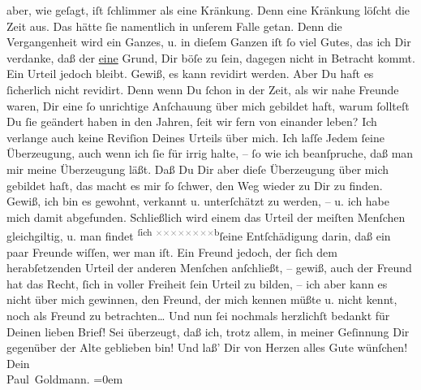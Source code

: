 \begin{ledgroupsized}[t]{13cm}
               aber, wie geſagt, {\pb}iſt ſchlimmer als eine
               Kränkung. Denn eine Kränkung löſcht die Zeit aus. Das hätte ſie namentlich in unſerem
               Falle getan. \strikeout{\textcolor{gray}{S}} Denn die Vergangenheit wird ein Ganzes, u. in dieſem Ganzen iſt ſo viel Gutes,
               das ich Dir verdanke, daß der \uline{eine} Grund, Dir böſe zu
               ſein, dagegen nicht in Betracht kommt.\pend
           \pstart
           Ein Urteil jedoch bleibt. Gewiß, es kann revidirt werden. Aber Du haft es ſicherlich
               nicht revidirt. Denn wenn Du ſchon in der Zeit, als wir nahe Freunde waren, Dir eine
               ſo unrichtige Anſchauung über mich {\pb}gebildet
               haft, warum ſollteſt Du ſie geändert haben in den Jahren, ſeit wir fern von einander
               leben? Ich verlange auch keine Reviſion Deines Urteils über mich. Ich laſſe Jedem
               ſeine Überzeugung, auch wenn ich ſie für irrig halte, – ſo wie ich beanſpruche, daß
               man mir meine Überzeugung läßt. Daß Du Dir aber dieſe Überzeugung über mich gebildet
               haſt, das macht es mir ſo ſchwer, den Weg wieder zu Dir zu finden. Gewiß, ich bin es
               gewohnt, verkannt u. unterſchätzt {\pb}zu werden, –
               u. ich habe mich damit abgefunden. Schließlich wird einem das Urteil der meiſten
               Menſchen gleichgiltig, u. man findet \substVorne{}\textsuperscript{ſich \textcolor{gray}{×}\-\textcolor{gray}{×}\-\textcolor{gray}{×}\-\textcolor{gray}{×}\-\textcolor{gray}{×}\-\textcolor{gray}{×}\-\textcolor{gray}{×}\-\textcolor{gray}{×}b}{\allowbreak}\substDazwischen{}ſeine Entſchädigung darin\substHinten{}, daß ein paar Freunde wiſſen, wer man iſt.\pend
           \pstart
           Ein Freund jedoch, 
               der ſich dem herabſetzenden Urteil der anderen Menſchen anſchließt, – gewiß,
               auch der Freund hat das Recht, ſich in voller Freiheit ſein Urteil zu bilden, – ich
               aber kann es nicht über mich {\pb}gewinnen, den
               Freund, der mich kennen müßte u. nicht kennt, noch als Freund zu betrachten{\dots}\pend
           \pstart
           Und nun ſei nochmals herzlichſt bedankt für Deinen lieben Brief! Sei überzeugt,
               daß ich, trotz allem, in meiner Geſinnung Dir gegenüber der Alte geblieben bin! Und
               laß’ Dir von Herzen alles Gute wünſchen!\pend
           \pstart
           Dein {\\[\baselineskip]}\spacefill\mbox{Paul Goldmann.}\pend
           \leftskip=0em{}
         
         \endnumbering{}\end{ledgroupsized}  \newcommand{\dateiname}{L03478}\newcommand{\titel}{Paul Goldmann an Arthur Schnitzler, 16. 2. 1925}\newcommand{\editorInnen}{Martin Anton Müller und Laura Untner}
      